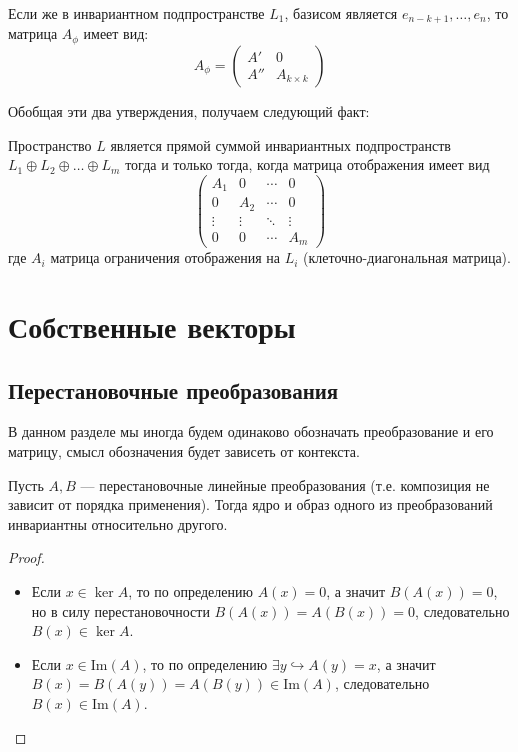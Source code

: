 Если же в инвариантном подпространстве $L_1$, базисом является $e_{n-k+1}, \dots, e_{n}$, то матрица $A_{\phi}$ имеет вид:
$$
A_{\phi}=\left(
    \begin{array}{c|c}
    A' & 0 \\
    \hline
     A'' & A_{k\times k}
    \end{array}
\right)
$$

Обобщая эти два утверждения, получаем следующий факт:
\begin{theorem}
    Пространство $L$ является прямой суммой инвариантных подпространств $L_1 \oplus L_2 \oplus \dots \oplus L_m$ тогда и только тогда, когда матрица отображения имеет вид 
    $$
        \begin{pmatrix}
        A_1 & 0 & \cdots & 0 \\
        0 & A_2 & \cdots & 0 \\
        \vdots & \vdots & \ddots & \vdots \\
        0 & 0 & \cdots & A_m
        \end{pmatrix}
    $$
где $A_i$ матрица ограничения отображения на $L_i$ (клеточно-диагональная матрица).
\end{theorem}

\section{Собственные векторы}
\subsection{Перестановочные преобразования}
В данном разделе мы иногда будем одинаково обозначать преобразование и его матрицу, смысл обозначения будет зависеть от контекста.
\begin{theorem}
    Пусть $A, B$ — перестановочные линейные преобразования (т.е. композиция не зависит от порядка применения). Тогда ядро и образ одного из преобразований инвариантны относительно другого.
\end{theorem}
\begin{proof}
    \begin{itemize}
        \item Если $x \in \ker A$, то по определению $A(x)=0$, а значит $B(A(x))=0$, но в силу перестановочности $B(A(x))=A(B(x))=0$, следовательно $B(x) \in \ker A$.
        \item Если $x \in \text{Im}(A)$, то по определению $\exists y \hookrightarrow A(y)=x$, а значит $B(x)=B(A(y))=A(B(y)) \in \text{Im}(A)$, следовательно $B(x)\in \text{Im}(A)$.
    \end{itemize}
\end{proof}

